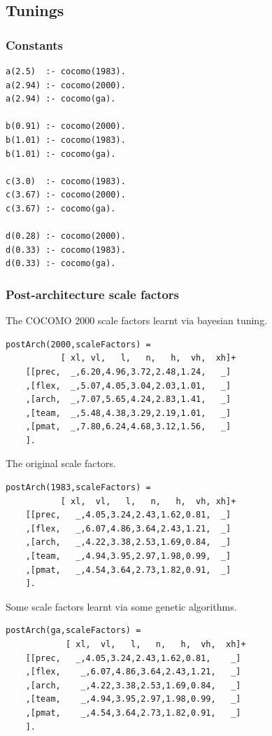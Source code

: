 \documentclass[twocolumn,global]{svjour}
\begin{document}
\subsection{ Tunings
}
\subsubsection{ Constants }\begin{Verbatim}
a(2.5)  :- cocomo(1983).
a(2.94) :- cocomo(2000).
a(2.94) :- cocomo(ga).

b(0.91) :- cocomo(2000).
b(1.01) :- cocomo(1983).
b(1.01) :- cocomo(ga).

c(3.0)  :- cocomo(1983).
c(3.67) :- cocomo(2000).
c(3.67) :- cocomo(ga).

d(0.28) :- cocomo(2000).
d(0.33) :- cocomo(1983).
d(0.33) :- cocomo(ga).
\end{Verbatim}
\subsubsection{ Post-architecture scale factors
}
 The COCOMO 2000 scale factors learnt
via bayesian tuning.  \begin{Verbatim}
postArch(2000,scaleFactors) =
           [ xl, vl,   l,   n,   h,  vh,  xh]+
    [[prec,  _,6.20,4.96,3.72,2.48,1.24,   _]
    ,[flex,  _,5.07,4.05,3.04,2.03,1.01,   _]
    ,[arch,  _,7.07,5.65,4.24,2.83,1.41,   _]
    ,[team,  _,5.48,4.38,3.29,2.19,1.01,   _]
    ,[pmat,  _,7.80,6.24,4.68,3.12,1.56,   _]
    ].
\end{Verbatim}
 The original scale factors.  \begin{Verbatim}
postArch(1983,scaleFactors) =
           [ xl,  vl,   l,   n,   h,  vh, xh]+
    [[prec,   _,4.05,3.24,2.43,1.62,0.81,  _]
    ,[flex,   _,6.07,4.86,3.64,2.43,1.21,  _]
    ,[arch,   _,4.22,3.38,2.53,1.69,0.84,  _]
    ,[team,   _,4.94,3.95,2.97,1.98,0.99,  _]
    ,[pmat,   _,4.54,3.64,2.73,1.82,0.91,  _]
    ].
\end{Verbatim}
 Some scale factors learnt via some
genetic algorithms.  \begin{Verbatim}
postArch(ga,scaleFactors) =
            [ xl,  vl,   l,   n,   h,  vh,  xh]+
    [[prec,   _,4.05,3.24,2.43,1.62,0.81,    _]
    ,[flex,    _,6.07,4.86,3.64,2.43,1.21,   _]
    ,[arch,    _,4.22,3.38,2.53,1.69,0.84,   _]
    ,[team,    _,4.94,3.95,2.97,1.98,0.99,   _]
    ,[pmat,    _,4.54,3.64,2.73,1.82,0.91,   _]
    ].












\end{Verbatim}
\end{document}
